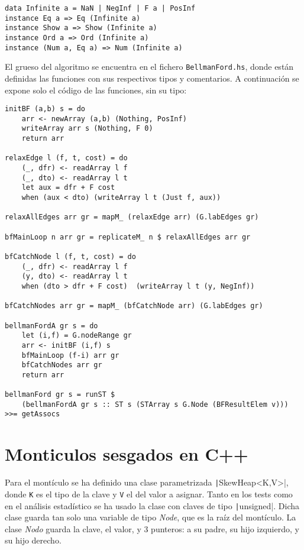 \documentclass{article}
\begin{document}
\begin{verbatim}
data Infinite a = NaN | NegInf | F a | PosInf
instance Eq a => Eq (Infinite a)
instance Show a => Show (Infinite a)
instance Ord a => Ord (Infinite a)
instance (Num a, Eq a) => Num (Infinite a)
\end{verbatim}

El grueso del algoritmo se encuentra en el fichero \texttt{BellmanFord.hs}, donde están definidas las funciones con sus respectivos tipos y comentarios. A continuación se expone solo el código de las funciones, sin su tipo:
\begin{verbatim}
initBF (a,b) s = do
    arr <- newArray (a,b) (Nothing, PosInf)
    writeArray arr s (Nothing, F 0)
    return arr

relaxEdge l (f, t, cost) = do
    (_, dfr) <- readArray l f
    (_, dto) <- readArray l t
    let aux = dfr + F cost
    when (aux < dto) (writeArray l t (Just f, aux))

relaxAllEdges arr gr = mapM_ (relaxEdge arr) (G.labEdges gr)

bfMainLoop n arr gr = replicateM_ n $ relaxAllEdges arr gr

bfCatchNode l (f, t, cost) = do
    (_, dfr) <- readArray l f
    (y, dto) <- readArray l t
    when (dto > dfr + F cost)  (writeArray l t (y, NegInf))

bfCatchNodes arr gr = mapM_ (bfCatchNode arr) (G.labEdges gr)

bellmanFordA gr s = do
    let (i,f) = G.nodeRange gr
    arr <- initBF (i,f) s
    bfMainLoop (f-i) arr gr
    bfCatchNodes arr gr
    return arr

bellmanFord gr s = runST $ 
	(bellmanFordA gr s :: ST s (STArray s G.Node (BFResultElem v))) >>= getAssocs
\end{verbatim}

\section{Monticulos sesgados en C++}
Para el montículo se ha definido una clase parametrizada \texttt|SkewHeap<K,V>|, donde \texttt{K} es el tipo de la clave y \texttt{V} el del valor a asignar. Tanto en los tests como en el análisis estadístico se ha usado la clase con claves de tipo \texttt|unsigned|. Dicha clase guarda tan solo una variable de tipo \textit{Node}, que es la raíz del montículo. La clase \textit{Nodo} guarda la clave, el valor, y 3 punteros: a su padre, su hijo izquierdo, y su hijo derecho.
\end{document}
